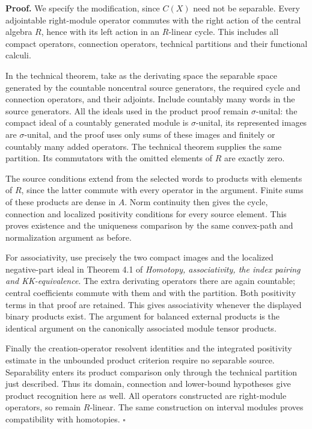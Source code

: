 \documentclass[
  11pt,
]{article}
\begin{document}
\textbf{Proof.} We specify the modification, since \(C(X)\) need not be
separable. Every adjointable right-module operator commutes with the
right action of the central algebra \(R\), hence with its left action in
an \(R\)-linear cycle. This includes all compact operators, connection
operators, technical partitions and their functional calculi.

In the technical theorem, take as the derivating space the separable
space generated by the countable noncentral source generators, the
required cycle and connection operators, and their adjoints. Include
countably many words in the source generators. All the ideals used in
the product proof remain \(\sigma\)-unital: the compact ideal of a
countably generated module is \(\sigma\)-unital, its represented images
are \(\sigma\)-unital, and the proof uses only sums of these images and
finitely or countably many added operators. The technical theorem
supplies the same partition. Its commutators with the omitted elements
of \(R\) are exactly zero.

The source conditions extend from the selected words to products with
elements of \(R\), since the latter commute with every operator in the
argument. Finite sums of these products are dense in \(A\). Norm
continuity then gives the cycle, connection and localized positivity
conditions for every source element. This proves existence and the
uniqueness comparison by the same convex-path and normalization argument
as before.

For associativity, use precisely the two compact images and the
localized negative-part ideal in Theorem 4.1 of \emph{Homotopy,
associativity, the index pairing and KK-equivalence}. The extra
derivating operators there are again countable; central coefficients
commute with them and with the partition. Both positivity terms in that
proof are retained. This gives associativity whenever the displayed
binary products exist. The argument for balanced external products is
the identical argument on the canonically associated module tensor
products.

Finally the creation-operator resolvent identities and the integrated
positivity estimate in the unbounded product criterion require no
separable source. Separability enters its product comparison only
through the technical partition just described. Thus its domain,
connection and lower-bound hypotheses give product recognition here as
well. All operators constructed are right-module operators, so remain
\(R\)-linear. The same construction on interval modules proves
compatibility with homotopies. \(\square\)
\end{document}
